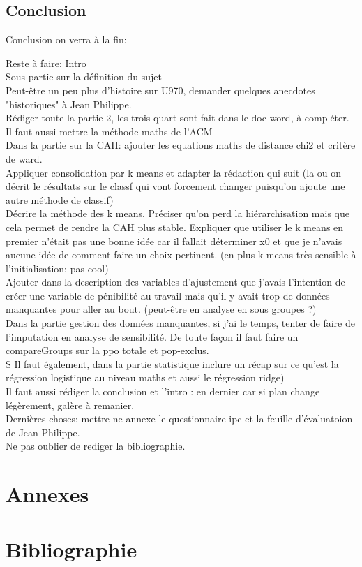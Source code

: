\documentclass{book}
\begin{document}
\newpage
\begin{center}
\section*{Conclusion}
Conclusion on verra à la fin:

Reste à faire: 
Intro\\
Sous partie sur la définition du sujet\\
Peut-être un peu plus d'histoire sur U970, demander quelques anecdotes "historiques" à Jean Philippe.\\
Rédiger toute la partie 2, les trois quart sont fait dans le doc word, à compléter.\\
Il faut aussi mettre la méthode maths de l'ACM\\
Dans la partie sur la CAH: ajouter les equations maths de distance chi2 et critère de ward.\\
Appliquer consolidation par k means et adapter la rédaction qui suit (la ou on décrit le résultats sur le classf qui vont forcement changer puisqu'on ajoute une autre méthode de classif)\\
Décrire la méthode des k means. Préciser qu'on perd la hiérarchisation mais que cela permet de rendre la CAH plus stable. Expliquer que utiliser le k means en premier n'était pas une bonne idée car il fallait déterminer x0 et que je n'avais aucune idée de comment faire un choix pertinent. (en plus k means très sensible à l'initialisation: pas cool)\\
Ajouter dans la description des variables d'ajustement que j'avais l'intention de créer une variable de pénibilité au travail mais qu'il y avait trop de données manquantes pour aller au bout. (peut-être en analyse en sous groupes ?)\\
Dans la partie gestion des données manquantes, si j'ai le temps, tenter de faire de l'imputation en analyse de sensibilité. De toute façon il faut faire un compareGroups sur la ppo totale et pop-exclus.\\S
Il faut également, dans la partie statistique inclure un récap sur ce qu'est la régression logistique au niveau maths et aussi le régression ridge)\\
Il faut aussi rédiger la conclusion et l'intro : en dernier car si plan change légèrement, galère à remanier.\\
Dernières choses: mettre ne annexe le questionnaire ipc et la feuille d'évaluatoion de Jean Philippe.\\
Ne pas oublier de rediger la bibliographie.\\
\end{center}

\backmatter
\section{Annexes}
\section{Bibliographie}
\end{document}
